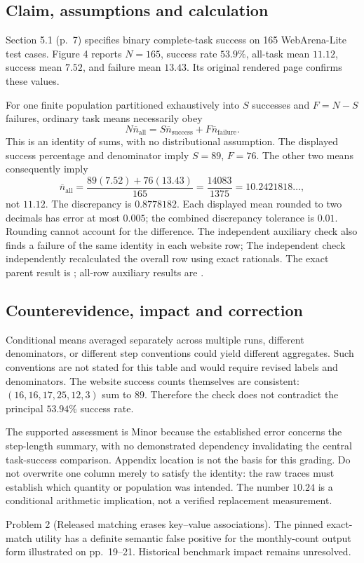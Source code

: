 \documentclass[10pt]{article}
\begin{document}
\subsection*{Claim, assumptions and calculation}
Section 5.1 (p. 7) specifies binary complete-task success on 165 WebArena-Lite test cases. Figure 4 reports \(N=165\), success rate \(53.9\%\), all-task mean \(11.12\), success mean \(7.52\), and failure mean \(13.43\). Its original rendered page confirms these values.\par
For one finite population partitioned exhaustively into \(S\) successes and \(F=N-S\) failures, ordinary task means necessarily obey \[N\overline n_{\mathrm{all}}
=S\overline n_{\mathrm{success}}+F\overline n_{\mathrm{failure}}.\] This is an identity of sums, with no distributional assumption. The displayed success percentage and denominator imply \(S=89\), \(F=76\). The other two means consequently imply \[\overline n_{\mathrm{all}}
=\frac{89(7.52)+76(13.43)}{165}
=\frac{14083}{1375}
=10.2421818\ldots,\] not \(11.12\). The discrepancy is \(0.8778182\). Each displayed mean rounded to two decimals has error at most \(0.005\); the combined discrepancy tolerance is \(0.01\). Rounding cannot account for the difference. The independent auxiliary check also finds a failure of the same identity in each website row; The independent check independently recalculated the overall row using exact rationals. The exact parent result is ; all-row auxiliary results are .\par
\subsection*{Counterevidence, impact and correction}
Conditional means averaged separately across multiple runs, different denominators, or different step conventions could yield different aggregates. Such conventions are not stated for this table and would require revised labels and denominators. The website success counts themselves are consistent: \((16,16,17,25,12,3)\) sum to \(89\). Therefore the check does not contradict the principal \(53.94\%\) success rate.\par
The supported assessment is Minor because the established error concerns the step-length summary, with no demonstrated dependency invalidating the central task-success comparison. Appendix location is not the basis for this grading. Do not overwrite one column merely to satisfy the identity: the raw traces must establish which quantity or population was intended. The number \(10.24\) is a conditional arithmetic implication, not a verified replacement measurement.\par
Problem 2 (Released matching erases key–value associations).  The pinned exact-match utility has a definite semantic false positive for the monthly-count output form illustrated on pp. 19–21. Historical benchmark impact remains unresolved.\par
\end{document}
